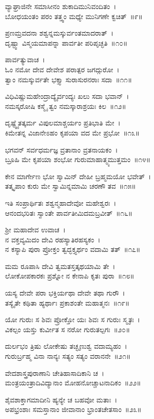 ವ್ಯಾಘ್ರಾಜಿನೇ ಸಮಾಸೀನಂ ಶುಕಾದಿಮುನಿವಂದಿತಂ~।\\
ಬೋಧಯಂತಂ ಪರಂ ತತ್ತ್ವಂ ಮಧ್ಯೇ ಮುನಿಗಣೇ ಕ್ವಚಿತ್~॥೯॥

ಪ್ರಣಮ್ರವದನಾ ಶಶ್ವನ್ನಮಸ್ಕುರ್ವಂತಮಾದರಾತ್~।\\
ದೃಷ್ಟ್ವಾ ವಿಸ್ಮಯಮಾಪನ್ನಾ ಪಾರ್ವತೀ ಪರಿಪೃಚ್ಛತಿ~॥೧೦॥

ಪಾರ್ವತ್ಯುವಾಚ~।\\
ಓಂ ನಮೋ ದೇವ ದೇವೇಶ ಪರಾತ್ಪರ ಜಗದ್ಗುರೋ~।\\
ತ್ವಾಂ ನಮಸ್ಕುರ್ವತೇ ಭಕ್ತ್ಯಾ ಸುರಾಸುರನರಾಃ ಸದಾ~॥೧೧॥

ವಿಧಿವಿಷ್ಣುಮಹೇಂದ್ರಾದ್ಯೈರ್ವಂದ್ಯಃ ಖಲು ಸದಾ ಭವಾನ್~।\\
ನಮಸ್ಕರೋಷಿ ಕಸ್ಮೈ ತ್ವಂ ನಮಸ್ಕಾರಾಶ್ರಯಃ ಕಿಲ~॥೧೨॥

ದೃಷ್ಟ್ವೈತತ್ಕರ್ಮ ವಿಪುಲಮಾಶ್ಚರ್ಯಂ ಪ್ರತಿಭಾತಿ ಮೇ~।\\
ಕಿಮೇತನ್ನ ವಿಜಾನೇಽಹಂ ಕೃಪಯಾ ವದ ಮೇ ಪ್ರಭೋ~॥೧೩॥

ಭಗವನ್ ಸರ್ವಧರ್ಮಜ್ಞ ವ್ರತಾನಾಂ ವ್ರತನಾಯಕಂ~।\\
ಬ್ರೂಹಿ ಮೇ ಕೃಪಯಾ ಶಂಭೋ ಗುರುಮಾಹಾತ್ಮ್ಯಮುತ್ತಮಂ~॥೧೪॥

ಕೇನ ಮಾರ್ಗೇಣ ಭೋ ಸ್ವಾಮಿನ್ ದೇಹೀ ಬ್ರಹ್ಮಮಯೋ ಭವೇತ್~।\\
ತತ್ಕೃಪಾಂ ಕುರು ಮೇ ಸ್ವಾಮಿನ್ನಮಾಮಿ ಚರಣೌ ತವ~॥೧೫॥

ಇತಿ ಸಂಪ್ರಾರ್ಥಿತಃ ಶಶ್ವನ್ಮಹಾದೇವೋ ಮಹೇಶ್ವರಃ~।\\
ಆನಂದಭರಿತಃ ಸ್ವಾಂತೇ ಪಾರ್ವತೀಮಿದಮಬ್ರವೀತ್~॥೧೬॥

ಶ್ರೀ ಮಹಾದೇವ ಉವಾಚ~।\\
ನ ವಕ್ತವ್ಯಮಿದಂ ದೇವಿ ರಹಸ್ಯಾತಿರಹಸ್ಯಕಂ~।\\
ನ ಕಸ್ಯಾಪಿ ಪುರಾ ಪ್ರೋಕ್ತಂ ತ್ವದ್ಭಕ್ತ್ಯರ್ಥಂ ವದಾಮಿ ತತ್~॥೧೭॥

ಮಮ ರೂಪಾಸಿ ದೇವಿ ತ್ವಮತಸ್ತತ್ಕಥಯಾಮಿ ತೇ~।\\
ಲೋಕೋಪಕಾರಕಃ ಪ್ರಶ್ನೋ ನ ಕೇನಾಪಿ ಕೃತಃ ಪುರಾ~॥೧೮॥

ಯಸ್ಯ ದೇವೇ ಪರಾ ಭಕ್ತಿರ್ಯಥಾ ದೇವೇ ತಥಾ ಗುರೌ~।\\
ತಸ್ಯೈತೇ ಕಥಿತಾ ಹ್ಯರ್ಥಾಃ ಪ್ರಕಾಶಂತೇ ಮಹಾತ್ಮನಃ~॥೧೯॥

ಯೋ ಗುರುಃ ಸ ಶಿವಃ ಪ್ರೋಕ್ತೋ ಯಃ ಶಿವಃ ಸ ಗುರುಃ ಸ್ಮೃತಃ~।\\
ವಿಕಲ್ಪಂ ಯಸ್ತು ಕುರ್ವೀತ ಸ ನರೋ ಗುರುತಲ್ಪಗಃ~॥೨೦॥

ದುರ್ಲಭಂ ತ್ರಿಷು ಲೋಕೇಷು ತಚ್ಛೃಣುಶ್ವ ವದಾಮ್ಯಹಂ~।\\
ಗುರುರ್ಬ್ರಹ್ಮ ವಿನಾ ನಾನ್ಯಃ ಸತ್ಯಂ ಸತ್ಯಂ ವರಾನನೇ~॥೨೧॥

ವೇದಶಾಸ್ತ್ರಪುರಾಣಾನಿ ಚೇತಿಹಾಸಾದಿಕಾನಿ ಚ~।\\
ಮಂತ್ರಯಂತ್ರಾದಿವಿದ್ಯಾನಾಂ ಮೋಹನೋಚ್ಚಾಟನಾದಿಕಂ~॥೨೨॥

ಶೈವಶಾಕ್ತಾಗಮಾದೀನಿ ಹ್ಯನ್ಯೇ ಚ ಬಹವೋ ಮತಾಃ~।\\
ಅಪಭ್ರಂಶಾಃ ಸಮಸ್ತಾನಾಂ ಜೀವಾನಾಂ ಭ್ರಾಂತಚೇತಸಾಂ~॥೨೩॥

